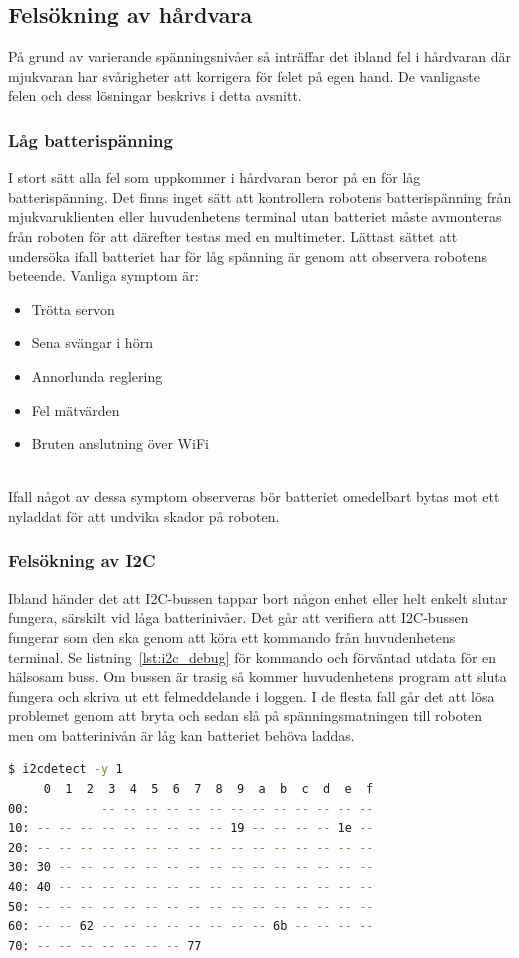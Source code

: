 \documentclass{article}
\begin{document}
\subsection{Felsökning av hårdvara}
På grund av varierande spänningsnivåer så inträffar det ibland fel i hårdvaran där mjukvaran har svårigheter att korrigera för felet på egen hand. De vanligaste felen och dess lösningar beskrivs i detta avsnitt.

\subsubsection{Låg batterispänning}
I stort sätt alla fel som uppkommer i hårdvaran beror på en för låg batterispänning. Det finns inget sätt att kontrollera robotens batterispänning från mjukvaruklienten eller huvudenhetens terminal utan batteriet måste avmonteras från roboten för att därefter testas med en multimeter. Lättast sättet att undersöka ifall batteriet har för låg spänning är genom att observera robotens beteende. Vanliga symptom är:

\begin{itemize}
    \item Trötta servon
    \item Sena svängar i hörn
    \item Annorlunda reglering
    \item Fel mätvärden
    \item Bruten anslutning över WiFi
\end{itemize}
\ \\
Ifall något av dessa symptom observeras bör batteriet omedelbart bytas mot ett nyladdat för att undvika skador på roboten.

\subsubsection{Felsökning av I2C}
Ibland händer det att I2C-bussen tappar bort någon enhet eller helt enkelt slutar fungera, särskilt vid låga batterinivåer. Det går att verifiera att I2C-bussen fungerar som den ska genom att köra ett kommando från huvudenhetens terminal. Se listning~\ref{lst:i2c_debug} för kommando och förväntad utdata för en hälsosam buss. Om bussen är trasig så kommer huvudenhetens program att sluta fungera och skriva ut ett felmeddelande i loggen. I de flesta fall går det att lösa problemet genom att bryta och sedan slå på spänningsmatningen till roboten men om batterinivån är låg kan batteriet behöva laddas.
\newline
\begin{lstlisting}[language=sh, label={lst:i2c_debug}, caption={Kommando och förväntad utdata för en fungerande I2C-buss}]
$ i2cdetect -y 1
     0  1  2  3  4  5  6  7  8  9  a  b  c  d  e  f
00:          -- -- -- -- -- -- -- -- -- -- -- -- --
10: -- -- -- -- -- -- -- -- -- 19 -- -- -- -- 1e --
20: -- -- -- -- -- -- -- -- -- -- -- -- -- -- -- --
30: 30 -- -- -- -- -- -- -- -- -- -- -- -- -- -- --
40: 40 -- -- -- -- -- -- -- -- -- -- -- -- -- -- --
50: -- -- -- -- -- -- -- -- -- -- -- -- -- -- -- --
60: -- -- 62 -- -- -- -- -- -- -- -- 6b -- -- -- --
70: -- -- -- -- -- -- -- 77
\end{lstlisting}
\end{document}
